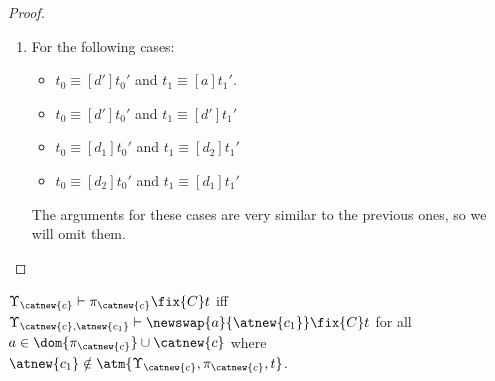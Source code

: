 \begin{proof}
\begin{description}
\begin{enumerate}
\begin{enumerate}
        \item For the following cases:
        \begin{itemize}
            \item $t_0\equiv [d']t_0'$ and $t_1 \equiv [a]t_1'$.
            \item $t_0 \equiv [d']t_0'$ and $t_1 \equiv [d']t_1'$
            \item $t_0 \equiv [d_1]t_0'$ and $t_1 \equiv [d_2]t_1'$
            \item $t_0 \equiv [d_2]t_0'$ and $t_1 \equiv [d_1]t_1'$
        \end{itemize}
        The arguments for these cases are very similar to the previous ones, so we will omit them.

            \end{enumerate}
        \end{enumerate}

\end{description}
\end{proof}

\begin{lemma}\label{alemma:characterization-fix-c-general}
    $\Upsilon_{\catnew{c}} \vdash \pi_{\catnew{c}} \fix{C} t$ iff $\Upsilon_{\catnew{c},\atnew{c_1}} \vdash \newswap{a}{\atnew{c_1}}\fix{C} t$ for all $a\in \dom{\pi_{\catnew{c}}}\cup\catnew{c}$ where $\atnew{c_1}\notin \atm{\Upsilon_{\catnew{c}},\pi_{\catnew{c}},t}$.
\end{lemma}

